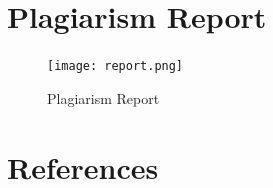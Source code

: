 \documentclass[oneside,a4paper,12pt, times]{book}
\begin{document}
\begin{appendices}
\\
\\

\chapter{Plagiarism Report}

\begin{figure}[h]
    \centering
    \texttt{[image: report.png]} 
    \caption{Plagiarism Report}
    \label{fig:my_label}
\end{figure}
    


\end{appendices}

\chapter{References}
\printbibliography[heading=none]
\end{document}
